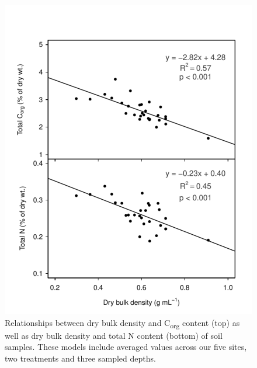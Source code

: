 \begin{figure}
  \centering
  \includegraphics[width=.85\textwidth]{Figures/chapter1/fig3}
\caption[Relationships between dry bulk density and C\textsubscript{org} content (top) as well as dry bulk density and total N content (bottom) of soil samples. These models include averaged values across our five sites, two treatments and three sampled depths]{Relationships between dry bulk density and C\textsubscript{org} content (top) as well as dry bulk density and total N content (bottom) of soil samples. These models include averaged values across our five sites, two treatments and three sampled depths.}
  \label{fig:1fig3}
\end{figure}

